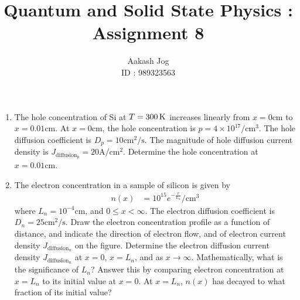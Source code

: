 \documentclass[fleqn, a4paper, 11pt, oneside]{amsart}
\title{Quantum and Solid State Physics : Assignment 8}
\author
{
	Aakash Jog\\
	ID : 989323563
}
\date{\formatdate{17}{12}{2015}}
\theoremstyle{definition}
\theoremstyle{theorem}
\begin{document}

\maketitle

\begin{question}
	\begin{enumerate}
		\item
			The hole concentration of Si at $T = 300 \kelvin$ increases linearly from $x = 0 \si{\centi\metre}$ to $x = 0.01 \si{\centi\metre}$.
			At $x = 0 \si{\centi\metre}$, the hole concentration is $p = 4 \times 10^{17} \si{\per\centi\metre\cubed}$.
			The hole diffusion coefficient is $D_p = 10 \si{\centi\metre\squared\per\second}$.
			The magnitude of hole diffusion current density is $J_{\text{diffusion}_p} = 20 \si{\ampere\per\centi\metre\squared}$.
			Determine the hole concentration at $x = 0.01 \si{\centi\metre}$.
		\item
			The electron concentration in a sample of silicon is given by
			\begin{align*}
				n(x) &= 10^{15} e^{-\frac{x}{L_n}} \si{\per\centi\metre\cubed}
			\end{align*}
			where $L_n = 10^{-4} \si{\centi\metre}$, and $0 \le x < \infty$.
			The electron diffusion coefficient is $D_n = 25 \si{\centi\metre\squared\per\second}$.
			Draw the electron concentration profile as a function of distance, and indicate the direction of electron flow, and of electron current density $J_{\text{diffusion}_n}$ on the figure.
			Determine the electron diffusion current density $J_{\text{diffusion}_n}$ at $x = 0$, $x = L_n$, and as $x \to \infty$.
			Mathematically, what is the significance of $L_n$?
			Answer this by comparing electron concentration at $x = L_n$ to its initial value at $x = 0$.
			At $x = L_n$, $n(x)$ has decayed to what fraction of its initial value?
	\end{enumerate}
\end{question}
\end{document}

